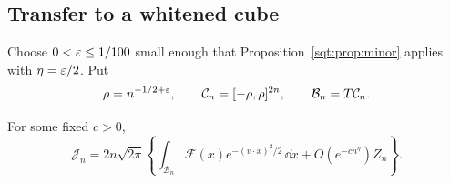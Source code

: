 \subsection{Transfer to a whitened cube}
Choose $0<\varepsilon\leq1/100$ small enough that Proposition~\ref{sqt:prop:minor} applies with $\eta=\varepsilon/2$. Put
\begin{equation}\label{sqt:eq:cubes}
\rho=n^{-1/2+\varepsilon},\qquad
\mathcal C_n=[-\rho,\rho]^{2n},\qquad\mathcal B_n=T\mathcal C_n.
\end{equation}
\begin{lemma}\label{sqt:lem:transfer}
For some fixed $c>0$,
\begin{equation}\label{sqt:eq:transfer}
\mathcal J_n=2n\sqrt{2\pi}\left\{
\int_{\mathcal B_n}\mathcal F(x)e^{-(v\cdot x)^2/2}\,\dd x
 +O(e^{-c n^\eta})Z_n\right\}.
\end{equation}
\end{lemma}
